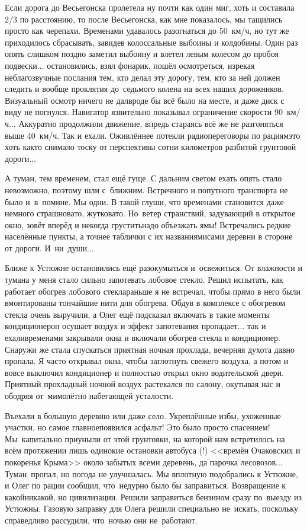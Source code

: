 Если дорога до Весьегонска пролетела ну почти как один миг, хоть и составила 2/3 по расстоянию, то после Весьегонска, как мне показалось, мы тащились просто как черепахи. Временами удавалось разогнаться до 50~км/ч, но тут же приходилось сбрасывать, завидев колоссальные выбоины и колдобины. Один раз опять слишком поздно заметил выбоину и влетел левым колесом до пробоя подвески$\ldots$ остановились, взял фонарик, пошёл осмотреться, изрекая неблагозвучные послания тем, кто делал эту дорогу, тем, кто за ней должен следить и вообще проклятия до~седьмого колена на вcех наших дорожников. Визуальный осмотр ничего не дал\mdash вроде бы всё было на месте, и даже диск с виду не погнулся. Навигатор язвительно показывал ограничение скорости 90~км/ч$\ldots$ Аккуратно продолжили движение, впредь стараясь всё же не разгоняться выше 40~км/ч. Так и ехали. Оживлённее потекли радиопереговоры по рациям\mdash это хоть как\sdash то снимало тоску от перспективы сотни километров разбитой грунтовой дороги$\ldots$

А туман, тем временем, стал ещё гуще. С дальним светом ехать опять стало невозможно, поэтому шли с~ближним. Встречного и попутного транспорта не было и~в~помине. Мы одни. В такой глуши, что временами становится даже немного страшновато, жутковато. Но~ветер странствий, задувающий в открытое окно, зовёт вперёд и некогда грустить\mdash надо объезжать ямы! Встречались редкие населённые пункты, а точнее таблички с их названиями\mdash сами деревни в стороне от дороги. И~ни~души$\ldots$

Ближе к Устюжне остановились ещё разок\mdash умыться и~освежиться. От влажности и тумана у меня стало сильно запотевать лобовое стекло. Решил испытать, как работает обогрев лобового стекла\mdash раньше я не встречал, чтобы прямо в него были вмонтированы тончайшие нити для обогрева. Обдув в комплексе с обогревом стекла очень выручили, а Олег ещё подсказал включать в такие моменты кондиционер\mdash он осушает воздух и эффект запотевания пропадает$\ldots$ так и ехали\mdash временами закрывали окна и включали обогрев стекла и кондиционер. Снаружи же стала спускаться приятная ночная прохлада, вечерняя духота давно пропала. Я часто открывал окна, чтобы заглотнуть свежего воздуха, а потом и вовсе выключил кондиционер и полностью открыл окно водительской двери. Приятный прохладный ночной воздух растекался по салону, окутывая нас и ободряя от~мимолётно набегающей усталости.

Въехали в большую деревню или даже село. Укреплённые избы, ухоженные участки, но самое главное\mdash появился асфальт! Это было просто спасением! Мы~капитально приуныли от этой грунтовки, на которой нам встретилось на всём протяжении лишь одинокие остановки автобуса (!) <<времён Очаковских и покоренья Крыма>> около забытых всеми деревень, да парочка лесовозов$\ldots$ Туман~пропал, но погода не улучшалась. Мы вплотную подобрались к Устюжне, и Олег по рации сообщил, что~недурно было бы заправиться. Возвращение к какой\sdash никакой, но цивилизации. Решили заправиться бензином сразу по~выезду из Устюжны. Газовую заправку для Олега решили специально не~искать, поскольку справедливо рассудили, что~ночью они не~работают.

